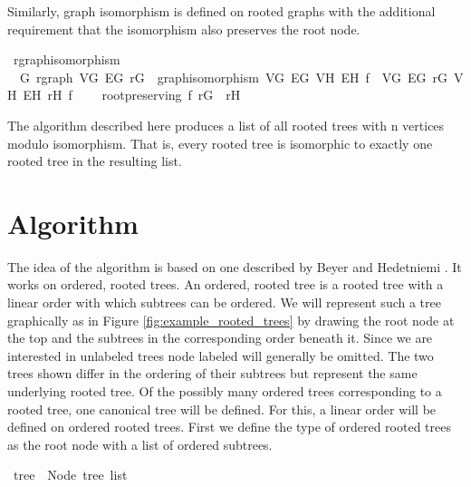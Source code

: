 Similarly, graph isomorphism is defined on rooted graphs with the additional requirement that the isomorphism also preserves the root node.

\begin{isabellebox}
    \isamarkupfalse%
    \ rgraph{\isacharunderscore}{\kern0pt}isomorphism\ {\isacharequal}{\kern0pt}\isanewline
    \ \ G{\isacharcolon}{\kern0pt}\ rgraph\ V\isactrlsub G\ E\isactrlsub G\ r\isactrlsub G\ {\isacharplus}{\kern0pt}\ graph{\isacharunderscore}{\kern0pt}isomorphism\ V\isactrlsub G\ E\isactrlsub G\ V\isactrlsub H\ E\isactrlsub H\ f\ \ V\isactrlsub G\ E\isactrlsub G\ r\isactrlsub G\ V\isactrlsub H\ E\isactrlsub H\ r\isactrlsub H\ f\ {\isacharplus}{\kern0pt}\isanewline
    \ \ \ root{\isacharunderscore}{\kern0pt}preserving{\isacharcolon}{\kern0pt}\ {\isachardoublequoteopen}f\ r\isactrlsub G\ {\isacharequal}{\kern0pt}\ r\isactrlsub H{\isachardoublequoteclose}
\end{isabellebox}

The algorithm described here produces a list of all rooted trees with n vertices modulo isomorphism.
That is, every rooted tree is isomorphic to exactly one rooted tree in the resulting list.


\section{Algorithm}

The idea of the algorithm is based on one described by Beyer and Hedetniemi \parencite{beyer}.
It works on ordered, rooted trees.
An ordered, rooted tree is a rooted tree with a linear order with which subtrees can be ordered.
We will represent such a tree graphically as in Figure \ref{fig:example_rooted_trees} by drawing the root node at the top and the subtrees in the corresponding order beneath it.
Since we are interested in unlabeled trees node labeled will generally be omitted.
The two trees shown differ in the ordering of their subtrees but represent the same underlying rooted tree.
Of the possibly many ordered trees corresponding to a rooted tree, one canonical tree will be defined.
For this, a linear order will be defined on ordered rooted trees.
First we define the type of ordered rooted trees as the root node with a list of ordered subtrees.

\begin{isabellebox}
\isamarkupfalse%
\ tree\ {\isacharequal}{\kern0pt}\ Node\ {\isachardoublequoteopen}tree\ list{\isachardoublequoteclose}
\end{isabellebox}

